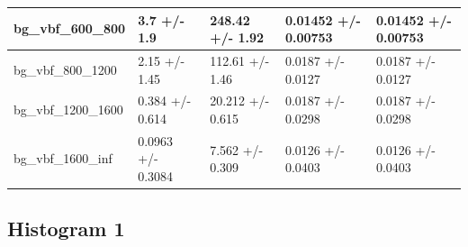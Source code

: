 \documentclass[a4paper, 10pt]{article}
\begin{document}
\begin{table}[H]
\begin{center}
\begin{tabular}{|m{20.0mm}|m{27.0mm}|m{27.0mm}|m{33.0mm}|m{32.0mm}|}
      \hline
      {\cellcolor{white}         bg\_vbf\_600\_800}& {\cellcolor{white}         3.7 +/\-- 1.9}& {\cellcolor{white}         248.42 +/\-- 1.92}& {\cellcolor{white}         0.01452 +/\-- 0.00753}& {\cellcolor{white}         0.01452 +/\-- 0.00753}\\
      \hline
      {\cellcolor{white}         bg\_vbf\_800\_1200}& {\cellcolor{white}         2.15 +/\-- 1.45}& {\cellcolor{white}         112.61 +/\-- 1.46}& {\cellcolor{white}         0.0187 +/\-- 0.0127}& {\cellcolor{white}         0.0187 +/\-- 0.0127}\\
      \hline
      {\cellcolor{white}         bg\_vbf\_1200\_1600}& {\cellcolor{white}         0.384 +/\-- 0.614}& {\cellcolor{white}         20.212 +/\-- 0.615}& {\cellcolor{white}         0.0187 +/\-- 0.0298}& {\cellcolor{white}         0.0187 +/\-- 0.0298}\\
      \hline
      {\cellcolor{white}         bg\_vbf\_1600\_inf}& {\cellcolor{white}         0.0963 +/\-- 0.3084}& {\cellcolor{white}         7.562 +/\-- 0.309}& {\cellcolor{white}         0.0126 +/\-- 0.0403}& {\cellcolor{white}         0.0126 +/\-- 0.0403}\\
\hline
    \end{tabular}
  \end{center}
\end{table}

   \newpage
\subsection{ Histogram 1}
\end{document}
